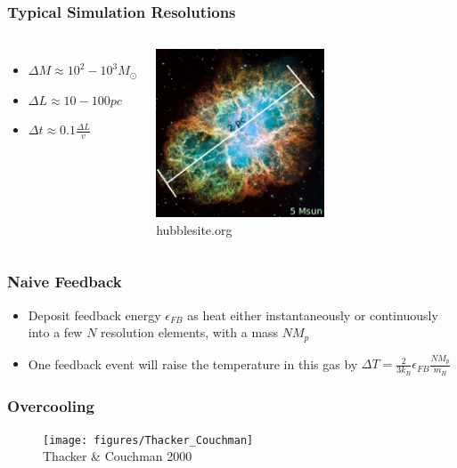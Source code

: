 \documentclass[serif,mathserif]{beamer}
\begin{document}
\begin{frame}
	\frametitle{Typical Simulation Resolutions}
	\begin{columns}[c]
	\begin{itemize}
		\item $\Delta M \approx 10^2-10^3 M_\odot$
		\item $\Delta L \approx 10-100 pc$
		\item $\Delta t \approx 0.1\frac{\Delta L}{v}$
	\end{itemize}
		\includegraphics[width=5cm]{figures/crab}\\
		\tiny{hubblesite.org}
	\end{columns}
\end{frame}

\begin{frame}
	\frametitle{Naive Feedback}
	\begin{itemize}
		\item Deposit feedback energy $\epsilon_{FB}$ as heat either instantaneously or
			continuously into a few $N$ resolution elements, with a mass $NM_p$
		\item One feedback event will raise the temperature in this gas by
			$\Delta T = \frac{2}{3k_B}\epsilon_{FB}\frac{NM_p}{m_H}$
	\end{itemize}
\end{frame}

\begin{frame}
	\frametitle{Overcooling}
	\begin{figure}[t]
	\centering
	\texttt{[image: figures/Thacker\_Couchman]}\\
	\tiny{Thacker \& Couchman 2000}
	\end{figure}
\end{frame}
\end{document}
